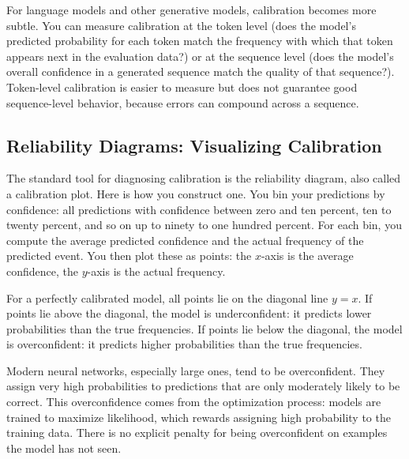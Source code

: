 \vspace{0.3cm}

For language models and other generative models, calibration becomes more subtle. You can measure calibration at the token level (does the model's predicted probability for each token match the frequency with which that token appears next in the evaluation data?) or at the sequence level (does the model's overall confidence in a generated sequence match the quality of that sequence?). Token-level calibration is easier to measure but does not guarantee good sequence-level behavior, because errors can compound across a sequence.

\vspace{1em}

\subsection{Reliability Diagrams: Visualizing Calibration}

The standard tool for diagnosing calibration is the reliability diagram, also called a calibration plot. Here is how you construct one. You bin your predictions by confidence: all predictions with confidence between zero and ten percent, ten to twenty percent, and so on up to ninety to one hundred percent. For each bin, you compute the average predicted confidence and the actual frequency of the predicted event. You then plot these as points: the $x$-axis is the average confidence, the $y$-axis is the actual frequency.

\vspace{0.3cm}

For a perfectly calibrated model, all points lie on the diagonal line $y = x$. If points lie above the diagonal, the model is underconfident: it predicts lower probabilities than the true frequencies. If points lie below the diagonal, the model is overconfident: it predicts higher probabilities than the true frequencies.

\vspace{0.3cm}

Modern neural networks, especially large ones, tend to be overconfident. They assign very high probabilities to predictions that are only moderately likely to be correct. This overconfidence comes from the optimization process: models are trained to maximize likelihood, which rewards assigning high probability to the training data. There is no explicit penalty for being overconfident on examples the model has not seen.

